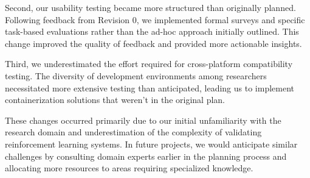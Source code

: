 \documentclass[12pt, titlepage]{article}
\begin{document}
\begin{enumerate}
  Second, our usability testing became more structured than originally planned. Following feedback from Revision 0, we implemented formal surveys and specific task-based evaluations rather than the ad-hoc approach initially outlined. This change improved the quality of feedback and provided more actionable insights.

  Third, we underestimated the effort required for cross-platform compatibility testing. The diversity of development environments among researchers necessitated more extensive testing than anticipated, leading us to implement containerization solutions that weren't in the original plan.

  These changes occurred primarily due to our initial unfamiliarity with the research domain and underestimation of the complexity of validating reinforcement learning systems. In future projects, we would anticipate similar challenges by consulting domain experts earlier in the planning process and allocating more resources to areas requiring specialized knowledge.
\end{enumerate}
\end{document}
